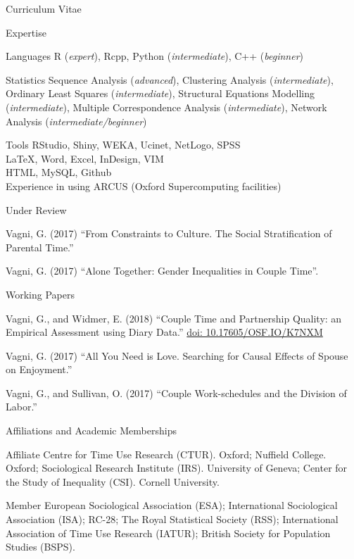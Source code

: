 \documentclass[12pt,a4paper]{article}
\newcommand*{\ac}[1]{\mbox{#1}}
\begin{document}
\begin{cv}{Curriculum Vitae}
  \begin{cvlist}{\ac{Expertise}}
  \item[Languages] R (\emph{expert}), Rcpp, Python (\emph{intermediate}),  C++ (\emph{beginner}) 
  
  \item[Statistics] Sequence Analysis (\emph{advanced}), 
  Clustering Analysis (\emph{intermediate}), 
  Ordinary Least Squares (\emph{intermediate}), Structural Equations Modelling (\emph{intermediate}), Multiple Correspondence Analysis (\emph{intermediate}), 
  Network Analysis (\emph{intermediate/beginner})
  
  \item[Tools] RStudio, Shiny, \ac{WEKA}, Ucinet, NetLogo, \ac{SPSS} \\ \LaTeX, Word, Excel, InDesign, \ac{VIM} \\ 
 \ac{HTML},  MySQL,  Github \\ 
 Experience in using ARCUS (Oxford Supercomputing facilities)
  \end{cvlist}

 \begin{cvlist}{Under Review}
 	
 	\item Vagni, G. (2017)  ``From Constraints to Culture. The Social Stratification of Parental Time.'' 
 	\item Vagni, G. (2017) ``Alone Together: Gender Inequalities in Couple Time''. 
 	
 \end{cvlist}
 
 \begin{cvlist}{Working Papers}
 	
 	\item Vagni, G., and Widmer, E. (2018)  ``Couple Time and Partnership Quality: an Empirical Assessment using Diary Data.''   \href{http://doi.org/10.17605/OSF.IO/K7NXM}{doi: 10.17605/OSF.IO/K7NXM} 
 	
 	\item Vagni, G. (2017) ``All You Need is Love. Searching for Causal Effects of Spouse on Enjoyment.'' 
 	
 	\item Vagni, G., and Sullivan, O. (2017)  ``Couple Work-schedules and the Division of Labor.''
 	
 \end{cvlist}

\begin{cvlist}{Affiliations and Academic Memberships}
	\item[Affiliate] Centre for Time Use Research (CTUR). Oxford; Nuffield College. Oxford; Sociological Research Institute (IRS). University of Geneva; Center for the Study of Inequality (CSI). Cornell University. 
	\item[Member] European Sociological Association (ESA); International Sociological Association (ISA); RC-28; The Royal Statistical Society (RSS); International Association of Time Use Research (IATUR); 
	British Society for Population Studies (BSPS). 
\end{cvlist}


\end{cv}
\end{document}
